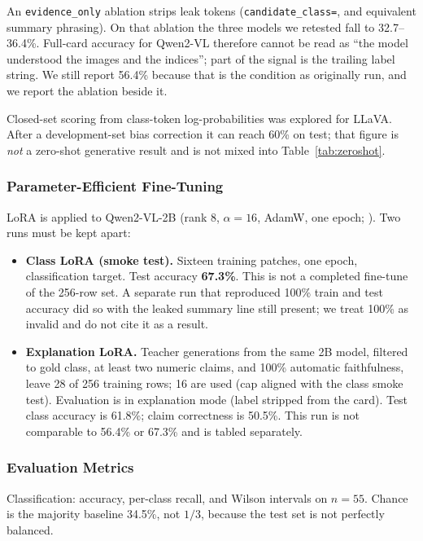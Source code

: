 \documentclass[11pt]{article}
\begin{document}
An \texttt{evidence\_only} ablation strips leak tokens
(\texttt{candidate\_class=}, and equivalent summary phrasing). On that
ablation the three models we retested fall to 32.7--36.4\%. Full-card
accuracy for Qwen2-VL therefore cannot be read as ``the model
understood the images and the indices''; part of the signal is the
trailing label string. We still report 56.4\% because that is the
condition as originally run, and we report the ablation beside it.

Closed-set scoring from class-token log-probabilities was explored
for LLaVA. After a development-set bias correction it can reach 60\%
on test; that figure is \emph{not} a zero-shot generative result and
is not mixed into Table~\ref{tab:zeroshot}.

\subsubsection{Parameter-Efficient Fine-Tuning}

LoRA \citep{hu2022lora} is applied to Qwen2-VL-2B (rank 8, $\alpha=16$,
AdamW, one epoch; \citealp{loshchilov2019}). Two runs must be kept
apart:

\begin{itemize}
\item \textbf{Class LoRA (smoke test).} Sixteen training patches, one
epoch, classification target. Test accuracy \textbf{67.3\%}. This is
not a completed fine-tune of the 256-row set. A separate run that
reproduced 100\% train and test accuracy did so with the leaked
summary line still present; we treat 100\% as invalid and do not
cite it as a result.
\item \textbf{Explanation LoRA.} Teacher generations from the same
2B model, filtered to gold class, at least two numeric claims, and
100\% automatic faithfulness, leave 28 of 256 training rows; 16 are
used (cap aligned with the class smoke test). Evaluation is in
explanation mode (label stripped from the card). Test class accuracy
is 61.8\%; claim correctness is 50.5\%. This run is not comparable
to 56.4\% or 67.3\% and is tabled separately.
\end{itemize}

\subsubsection{Evaluation Metrics}

Classification: accuracy, per-class recall, and Wilson intervals on
$n=55$. Chance is the majority baseline 34.5\%, not $1/3$, because
the test set is not perfectly balanced.
\end{document}
